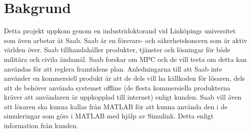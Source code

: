 \section{Bakgrund}    
Detta projekt uppkom genom en industridoktorand vid Linköpings universitet som även arbetar åt Saab. Saab är en försvars- och säkerhetskoncern som är aktiv världen över. Saab tillhandahåller produkter, tjänster och lösningar för både militära och civila ändamål. \citep{SAABbrief}
\newline
\newline
Saab forskar om MPC och de vill testa om detta kan användas för att reglera framtidens plan\citep{danielSimon}.
Anledningarna till att Saab inte använder en kommersiell produkt är att de dels vill ha källkoden för lösaren, dels att de behöver använda systemet offline (de flesta kommersiella produkterna kräver att användaren är uppkopplad till internet) enligt kunden.  
\newline
\newline
Saab vill även att lösaren ska kunna kallas från MATLAB för att kunna använda den i de simuleringar som görs i MATLAB med hjälp av Simulink. Detta enligt information från kunden.  
